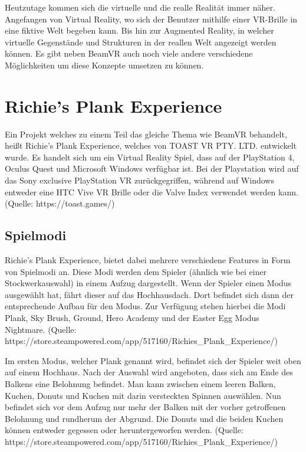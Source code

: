 %

Heutzutage kommen sich die virtuelle und die realle Realität immer näher.
Angefangen von Virtual Reality, wo sich der Benutzer mithilfe einer VR-Brille in eine fiktive Welt begeben kann.
Bis hin zur Augmented Reality, in welcher virtuelle Gegenstände und Strukturen in der reallen Welt angezeigt werden können.
Es gibt neben BeamVR auch noch viele andere verschiedene Möglichkeiten um diese Konzepte umsetzen zu können.



\section{Richie's Plank Experience}
Ein Projekt welches zu einem Teil das gleiche Thema wie BeamVR behandelt, heißt Richie's Plank Experience, welches von TOAST VR PTY. LTD. entwickelt wurde.
Es handelt sich um ein Virtual Reality Spiel, dass auf der PlayStation 4, Oculus Quest und Microsoft Windows verfügbar ist.
Bei der Playstation wird auf das Sony exclusive PlayStation VR zurückgegriffen, während auf Windows entweder eine HTC Vive VR Brille oder die Valve Index verwendet werden kann.
(Quelle: https://toast.games/)

\subsection{Spielmodi}
Richie's Plank Experience, bietet dabei mehrere verschiedene Features in Form von Spielmodi an.
Diese Modi werden dem Spieler (ähnlich wie bei einer Stockwerkauswahl) in einem Aufzug dargestellt.
Wenn der Spieler einen Modus ausgewählt hat, fährt dieser auf das Hochhausdach.
Dort befindet sich dann der entsprechende Aufbau für den Modus.
Zur Verfügung stehen hierbei die Modi Plank, Sky Brush, Ground, Hero Academy und der Easter Egg Modus Nightmare.
(Quelle: https://store.steampowered.com/app/517160/Richies_Plank_Experience/)

Im ersten Modus, welcher Plank genannt wird, befindet sich der Spieler weit oben auf einem Hochhaus.
Nach der Auswahl wird angeboten, dass sich am Ende des Balkens eine Belohnung befindet.
Man kann zwischen einem leeren Balken, Kuchen, Donuts und Kuchen mit darin versteckten Spinnen auswählen.
Nun befindet sich vor dem Aufzug nur mehr der Balken mit der vorher getroffenen Belohnung und rundherum der Abgrund.
Die Donuts und die beiden Kuchen können entweder gegessen oder heruntergeworfen werden.
(Quelle: https://store.steampowered.com/app/517160/Richies_Plank_Experience/)

